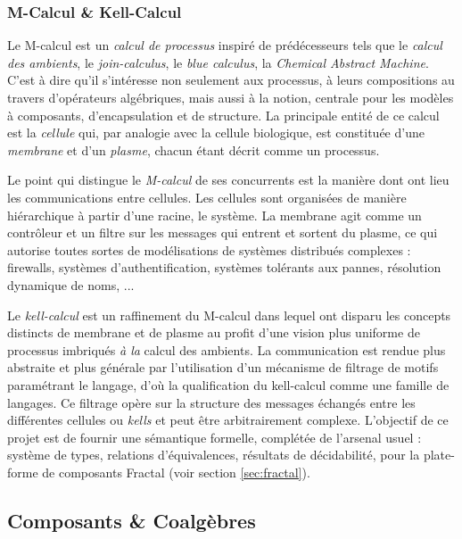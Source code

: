 \subsubsection{M-Calcul \& Kell-Calcul}

Le \textsf{M-calcul}\cite{M-calcul} est un \emph{calcul de processus} inspir\'e de
pr\'ed\'ecesseurs tels que le \emph{calcul des ambients}, le
\emph{join-calculus}, le \emph{blue calculus}, la \emph{Chemical
  Abstract Machine}. C'est \`a dire qu'il s'int\'eresse non
seulement aux processus, \`a leurs compositions au travers
d'op\'erateurs alg\'ebriques, mais aussi \`a la notion, centrale
pour les mod\`eles \`a composants, d'encapsulation et de
structure. La principale entit\'e de ce calcul est la \emph{cellule}
qui, par analogie avec la cellule biologique, est constitu\'ee d'une
\emph{membrane}  et d'un \emph{plasme}, chacun \'etant d\'ecrit
comme  un processus.

Le point qui distingue le \emph{M-calcul} de ses concurrents est la
mani\`ere dont ont lieu les communications entre cellules. Les
cellules sont organis\'ees de mani\`ere hi\'erarchique \`a partir
d'une racine, le syst\`eme. La membrane agit comme un contr\^oleur
et un filtre sur les messages qui entrent  et sortent du plasme, ce qui
autorise toutes sortes de mod\'elisations de syst\`emes distribu\'es
complexes : firewalls, syst\`emes d'authentification, syst\`emes
tol\'erants aux pannes, r\'esolution dynamique de noms, ... 

Le \emph{kell-calcul}\cite{kell-calculus} est un raffinement du M-calcul dans
lequel ont disparu les concepts distincts de membrane et de plasme au
profit d'une vision plus uniforme de processus imbriqu\'es \emph{\`a la}
calcul des ambients.  La communication est rendue plus abstraite et
plus g\'en\'erale par l'utilisation d'un m\'ecanisme de
filtrage de motifs param\'etrant le
langage, d'o\`u la qualification du kell-calcul comme une famille
de langages. Ce filtrage op\`ere sur la structure des messages
\'echang\'es entre les diff\'erentes cellules ou \emph{kells} 
et peut \^etre arbitrairement complexe. L'objectif de
ce projet est de fournir une s\'emantique formelle, compl\'et\'ee
de l'arsenal usuel : syst\`eme de types, relations d'\'equivalences,
r\'esultats de d\'ecidabilit\'e, pour la plate-forme de composants
\textsf{Fractal} (voir section \ref{sec:fractal}).

\subsection{Composants \& Coalg\`ebres}

